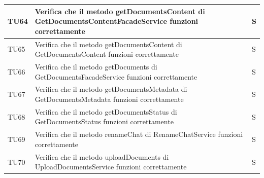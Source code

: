 \documentclass[10pt, a4paper]{article}
\begin{document}
\begin{xltabular}{\textwidth}{p{0.12\textwidth}|p{0.7\textwidth}|X}
TU64 & Verifica che il metodo getDocumentsContent di GetDocumentsContentFacadeService funzioni correttamente & S \\
\hline
TU65 & Verifica che il metodo getDocumentsContent di GetDocumentsContent funzioni correttamente & S \\
\hline
TU66 & Verifica che il metodo getDocuments di GetDocumentsFacadeService funzioni correttamente & S \\
\hline
TU67 & Verifica che il metodo getDocumentsMetadata di GetDocumentsMetadata funzioni correttamente & S \\
\hline
TU68 & Verifica che il metodo getDocumentsStatus di GetDocumentsStatus funzioni correttamente & S \\
\hline
TU69 & Verifica che il metodo renameChat di RenameChatService funzioni correttamente & S \\
\hline
TU70 & Verifica che il metodo uploadDocuments di UploadDocumentsService funzioni correttamente & S \\
\hline













\end{xltabular}
\end{document}
